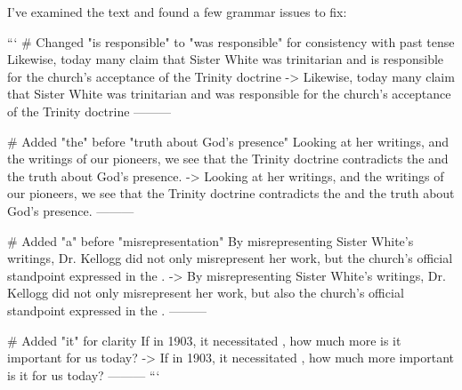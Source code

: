 I've examined the text and found a few grammar issues to fix:

```
# Changed "is responsible" to "was responsible" for consistency with past tense
Likewise, today many claim that Sister White was trinitarian and is responsible for the church's acceptance of the Trinity doctrine
->
Likewise, today many claim that Sister White was trinitarian and was responsible for the church's acceptance of the Trinity doctrine
---------

# Added "the" before "truth about God's presence"
Looking at her writings, and the writings of our pioneers, we see that the Trinity doctrine contradicts the  and the truth about God's presence.
->
Looking at her writings, and the writings of our pioneers, we see that the Trinity doctrine contradicts the  and the truth about God's presence.
---------

# Added "a" before "misrepresentation"
By misrepresenting Sister White's writings, Dr. Kellogg did not only misrepresent her work, but the church's official standpoint expressed in the .
->
By misrepresenting Sister White's writings, Dr. Kellogg did not only misrepresent her work, but also the church's official standpoint expressed in the .
---------

# Added "it" for clarity
If in 1903, it necessitated , how much more is it important for us today?
->
If in 1903, it necessitated , how much more important is it for us today?
---------
```